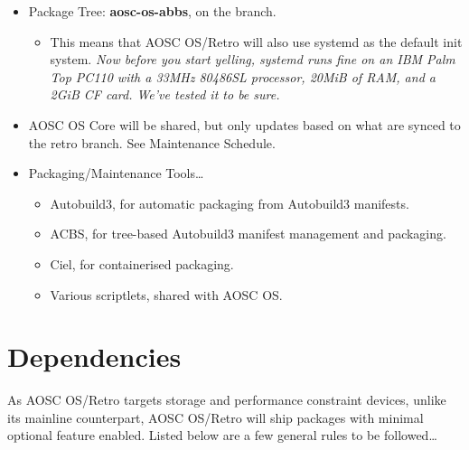     \begin{itemize}
    \item Package Tree: \textbf{aosc-os-abbs}, on the  branch.
        \begin{itemize}
            \item This means that AOSC OS/Retro will also use systemd as the default init system.
                {\itshape Now before you start yelling, systemd runs fine on an IBM Palm Top PC110
                with a 33MHz 80486SL processor, 20MiB of RAM, and a 2GiB CF card. We've tested it to be sure.}
        \end{itemize}
    \item AOSC OS Core will be shared, but only updates based on what are synced to the retro branch. See Maintenance Schedule.
    \item Packaging/Maintenance Tools\ldots
        \begin{itemize}
            \item Autobuild3, for automatic packaging from Autobuild3 manifests.
            \item ACBS, for tree-based Autobuild3 manifest management and packaging.
            \item Ciel, for containerised packaging.
            \item Various scriptlets, shared with AOSC OS.
        \end{itemize}
    \end{itemize}
    

    \section{Dependencies}

    As AOSC OS/Retro targets storage and performance constraint devices, unlike its mainline counterpart,
    AOSC OS/Retro will ship packages with minimal optional feature enabled.
    Listed below are a few general rules to be followed\ldots


